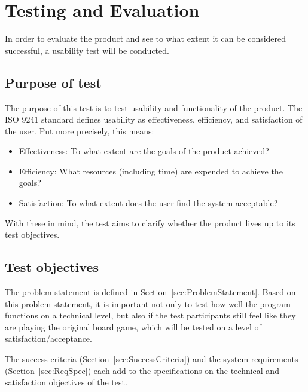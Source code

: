 \chapter{Testing and Evaluation}\label{ch:testeval}
In order to evaluate the product and see to what extent it can be considered successful, a usability test will be conducted.

\section{Purpose of test}
The purpose of this test is to test usability and functionality of the product. The ISO 9241 \citep{ISO} standard defines usability as effectiveness, efficiency, and satisfaction of the user. Put more precisely, this means:
\begin{itemize}
\item Effectiveness: To what extent are the goals of the product achieved?
\item Efficiency: What resources (including time) are expended to achieve the goals?
\item Satisfaction: To what extent does the user find the system acceptable?
\end{itemize}
With these in mind, the test aims to clarify whether the product lives up to its test objectives.

\section{Test objectives}\label{sec:TestObjectives}
The problem statement is defined in Section~\ref{sec:ProblemStatement}. Based on this problem statement, it is important not only to test how well the program functions on a technical level, but also if the test participants still feel like they are playing the original board game, which will be tested on a level of satisfaction/acceptance.

The success criteria (Section~\ref{sec:SuccessCriteria}) and the system requirements (Section~\ref{sec:ReqSpec}) each add to the specifications on the technical and satisfaction  objectives of the test.

